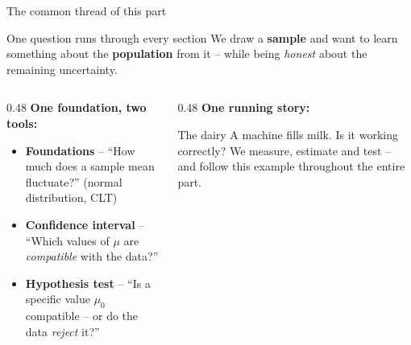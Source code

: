 \documentclass[aspectratio=169,11pt]{beamer}
\begin{document}
\begin{frame}{The common thread of this part}
  \begin{block}{One question runs through every section}
    We draw a \textbf{sample} and want to learn something about the
    \textbf{population} from it -- while being \emph{honest} about the
    remaining uncertainty.
  \end{block}
  \begin{columns}[T]
    \begin{column}{0.48\textwidth}
      \small
      \textbf{One foundation, two tools:}
      \begin{itemize}\setlength{\itemsep}{3pt}
        \item \textcolor{hsbiblau}{\textbf{Foundations}} -- ``How much does a
              sample mean fluctuate?'' (normal distribution, CLT)
        \item \textcolor{hsbiblau}{\textbf{Confidence interval}} --
              ``Which values of $\mu$ are \emph{compatible} with the data?''
        \item \textcolor{hsbiblau}{\textbf{Hypothesis test}} --
              ``Is a specific value $\mu_0$ compatible -- or do the data
              \emph{reject} it?''
      \end{itemize}
    \end{column}
    \begin{column}{0.48\textwidth}
      \small
      \textbf{One running story:}
      \begin{block}{The dairy}
        A machine fills milk. Is it working correctly? We measure,
        estimate and test -- and follow this example throughout the
        entire part.
      \end{block}
    \end{column}
  \end{columns}
\end{frame}
\end{document}
